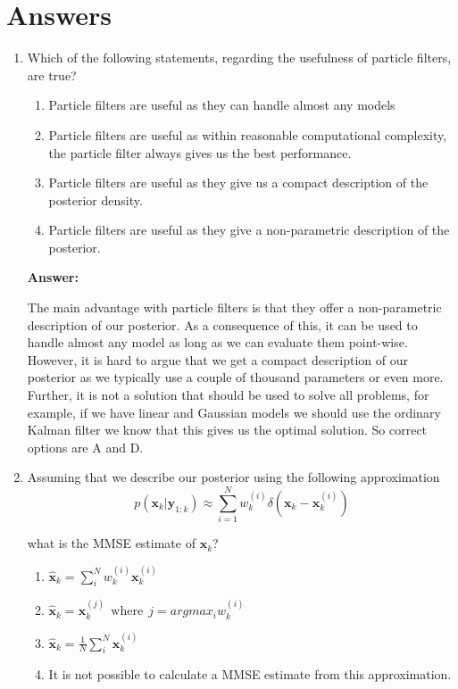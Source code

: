 \section{Answers}

\begin{enumerate}
\item Which of the following statements, regarding the usefulness of particle filters, are true?

\begin{enumerate}
\item Particle filters are useful as they can handle almost any models
\item Particle filters are useful as within reasonable computational complexity, the particle filter always gives us the best performance. 
\item Particle filters are useful as they give us a compact description of the posterior density. 
\item Particle filters are useful as they give a non-parametric description of the posterior.
\end{enumerate}

\textbf{Answer:}

The main advantage with particle filters is that they offer a non-parametric description of our posterior. As a consequence of this, it can be used to handle almost any model as long as we can evaluate them point-wise. However, it is hard to argue that we get a compact description of our posterior as we typically use a couple of thousand parameters or even more. Further, it is not a solution that should be used to solve all problems, for example, if we have linear and Gaussian models we should use the ordinary Kalman filter we know that this gives us the optimal solution. So correct options are A and D.
\item Assuming that we describe our posterior using the following approximation
\begin{equation}
p(\mathbf{x}_k | \mathbf{y}_{1:k}) \approx \sum_{i=1}^N w_{k}^{(i)} \delta (\mathbf{x}_k -\mathbf{x}_{k}^{(i)})
\end{equation}

what is the MMSE estimate of $\mathbf{x}_k$?
\begin{enumerate}
\item $\hat{\mathbf{x}}_k = \sum_{i}^{N} w_{k}^{(i)} \mathbf{x}_{k}^{(i)}$
\item $\hat{\mathbf{x}}_k = \mathbf{x}_{k}^{(j)} ~~ \text{where} ~~ j = argmax_i w_{k}^{(i)}$
\item $\hat{\mathbf{x}}_k = \frac{1}{N}\sum_{i}^{N}  \mathbf{x}_{k}^{(i)}$
\item It is not possible to calculate a MMSE estimate from this approximation. 
\end{enumerate}


\end{enumerate}
